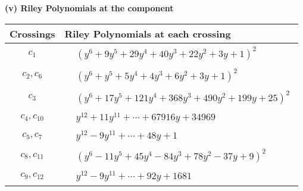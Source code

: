 \documentclass[1p]{elsarticle_modified}
\theoremstyle{definition}
\begin{document}
\newpage\renewcommand{\arraystretch}{1}
\flushleft \textbf{(v) Riley Polynomials at the component}\newline \\
\begin{tabular}{m{50pt}|m{274pt}}
Crossings & \hspace{64pt}Riley Polynomials at each crossing \\
\hline $$\begin{aligned}c_{1}\end{aligned}$$&$\begin{aligned}
&(y^6+9 y^5+29 y^4+40 y^3+22 y^2+3 y+1)^2
\end{aligned}$\\
\hline $$\begin{aligned}c_{2},c_{6}\end{aligned}$$&$\begin{aligned}
&(y^6+y^5+5 y^4+4 y^3+6 y^2+3 y+1)^2
\end{aligned}$\\
\hline $$\begin{aligned}c_{3}\end{aligned}$$&$\begin{aligned}
&(y^6+17 y^5+121 y^4+368 y^3+490 y^2+199 y+25)^2
\end{aligned}$\\
\hline $$\begin{aligned}c_{4},c_{10}\end{aligned}$$&$\begin{aligned}
&y^{12}+11 y^{11}+\cdots+67916 y+34969
\end{aligned}$\\
\hline $$\begin{aligned}c_{5},c_{7}\end{aligned}$$&$\begin{aligned}
&y^{12}-9 y^{11}+\cdots+48 y+1
\end{aligned}$\\
\hline $$\begin{aligned}c_{8},c_{11}\end{aligned}$$&$\begin{aligned}
&(y^6-11 y^5+45 y^4-84 y^3+78 y^2-37 y+9)^2
\end{aligned}$\\
\hline $$\begin{aligned}c_{9},c_{12}\end{aligned}$$&$\begin{aligned}
&y^{12}-9 y^{11}+\cdots+92 y+1681
\end{aligned}$\\
\hline
\end{tabular}\\~\\
\end{document}
